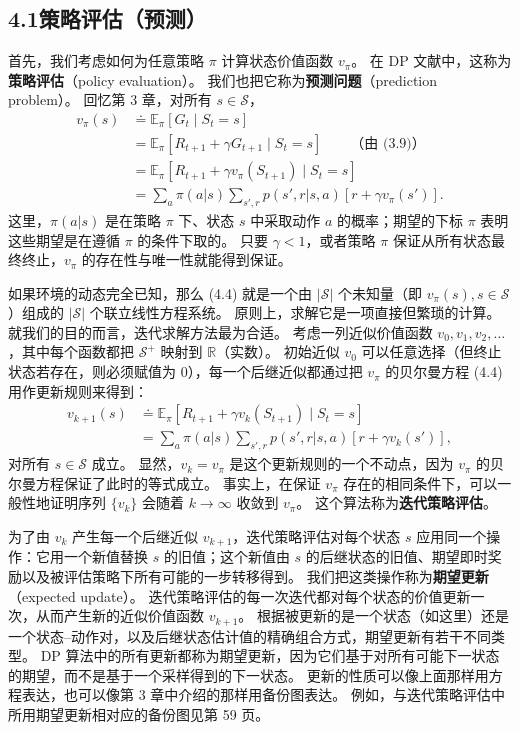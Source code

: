 \documentclass[UTF8,12pt,a4paper,fontset=fandol]{ctexart}
\begin{document}
\subsection*{4.1\quad 策略评估（预测）}

首先，我们考虑如何为任意策略 $\pi$ 计算状态价值函数 $v_\pi$。
在 DP 文献中，这称为\textbf{策略评估}（policy evaluation）。
我们也把它称为\textbf{预测问题}（prediction problem）。
回忆第 3 章，对所有 $s\in\mathcal{S}$，
\begin{align}
v_\pi(s)
&\doteq \mathbb{E}_\pi[G_t\mid S_t=s] \\
&= \mathbb{E}_\pi[R_{t+1}+\gamma G_{t+1}\mid S_t=s] \qquad \text{（由 (3.9)）}\\
&= \mathbb{E}_\pi[R_{t+1}+\gamma v_\pi(S_{t+1})\mid S_t=s] \tag{4.3}\\
&= \sum_a \pi(a|s)\sum_{s',r}p(s',r|s,a)\left[r+\gamma v_\pi(s')\right].
\tag{4.4}
\end{align}
这里，$\pi(a|s)$ 是在策略 $\pi$ 下、状态 $s$ 中采取动作 $a$ 的概率；期望的下标 $\pi$ 表明这些期望是在遵循 $\pi$ 的条件下取的。
只要 $\gamma<1$，或者策略 $\pi$ 保证从所有状态最终终止，$v_\pi$ 的存在性与唯一性就能得到保证。

如果环境的动态完全已知，那么 (4.4) 就是一个由 $|\mathcal{S}|$ 个未知量（即 $v_\pi(s),s\in\mathcal{S}$）组成的 $|\mathcal{S}|$ 个联立线性方程系统。
原则上，求解它是一项直接但繁琐的计算。
就我们的目的而言，迭代求解方法最为合适。
考虑一列近似价值函数 $v_0,v_1,v_2,\ldots$，其中每个函数都把 $\mathcal{S}^+$ 映射到 $\mathbb{R}$（实数）。
初始近似 $v_0$ 可以任意选择（但终止状态若存在，则必须赋值为 $0$），每一个后继近似都通过把 $v_\pi$ 的贝尔曼方程 (4.4) 用作更新规则来得到：
\begin{equation}
\begin{aligned}
v_{k+1}(s)
&\doteq \mathbb{E}_\pi[R_{t+1}+\gamma v_k(S_{t+1})\mid S_t=s] \\
&= \sum_a \pi(a|s)\sum_{s',r}p(s',r|s,a)\left[r+\gamma v_k(s')\right],
\end{aligned}
\tag{4.5}
\end{equation}
对所有 $s\in\mathcal{S}$ 成立。
显然，$v_k=v_\pi$ 是这个更新规则的一个不动点，因为 $v_\pi$ 的贝尔曼方程保证了此时的等式成立。
事实上，在保证 $v_\pi$ 存在的相同条件下，可以一般性地证明序列 $\{v_k\}$ 会随着 $k\to\infty$ 收敛到 $v_\pi$。
这个算法称为\textbf{迭代策略评估}。

为了由 $v_k$ 产生每一个后继近似 $v_{k+1}$，迭代策略评估对每个状态 $s$ 应用同一个操作：它用一个新值替换 $s$ 的旧值；这个新值由 $s$ 的后继状态的旧值、期望即时奖励以及被评估策略下所有可能的一步转移得到。
我们把这类操作称为\textbf{期望更新}（expected update）。
迭代策略评估的每一次迭代都对每个状态的价值更新一次，从而产生新的近似价值函数 $v_{k+1}$。
根据被更新的是一个状态（如这里）还是一个状态--动作对，以及后继状态估计值的精确组合方式，期望更新有若干不同类型。
DP 算法中的所有更新都称为期望更新，因为它们基于对所有可能下一状态的期望，而不是基于一个采样得到的下一状态。
更新的性质可以像上面那样用方程表达，也可以像第 3 章中介绍的那样用备份图表达。
例如，与迭代策略评估中所用期望更新相对应的备份图见第 59 页。
\end{document}
